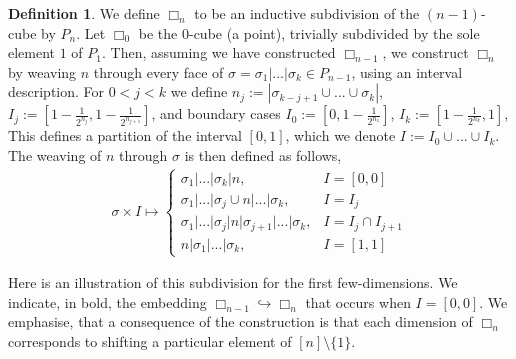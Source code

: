\documentclass{amsart}
\newcommand{\darkblue}{\color{darkblue}} %
\theoremstyle{definition}
\newtheorem{definition}[theorem]{Definition}
\newcommand{\defn}[1]{\textsl{\darkblue #1}} %
\newcommand{\divcube}[1]{\Box_{#1}}
\begin{document}
\begin{definition}
We define \defn{$\divcube{n}$} to be an inductive subdivision of the $(n-1)$-cube by $P_n$.
Let $\divcube{0}$ be the $0$-cube (a point), trivially subdivided by the sole element $1$ of $P_1$.
Then, assuming we have constructed $\divcube{n-1}$, we construct $\divcube{n}$ by weaving $n$ through every face of $\sigma = \sigma_1|...|\sigma_k \in P_{n-1}$, using an interval description.
For $0<j<k$ we define
$n_j := |\sigma_{k-j+1}\cup...\cup \sigma_k|$, $I_j := [1 - \frac{1}{2^{n_j}}, 1 - \frac{1}{2^{n_{j+1}}}]$, and boundary cases $I_0:= [0,1 - \frac{1}{2^{n_1}}]$, $I_k:= [1 - \frac{1}{2^{n_k}},1]$,
This defines a partition of the interval $[0,1]$, which we denote $I := I_0 \cup ... \cup I_k$.
The weaving of $n$ through $\sigma$ is then defined as follows,
\begin{align} \label{eq:SU cube inductive def}
    \sigma \times I \mapsto 
    \begin{cases}
        \sigma_1|...|\sigma_k| n, &I = [0, 0]\\
        \sigma_1|...|\sigma_j \cup n|...|\sigma_k, &I = I_j\\
        \sigma_1|...|\sigma_j|n|\sigma_{j+1}|...|\sigma_k, &I = I_j \cap I_{j+1}\\
        n|\sigma_1|...|\sigma_k, &I = [1, 1]
    \end{cases}
\end{align}
\end{definition}

Here is an illustration of this subdivision for the first few-dimensions.
We indicate, in bold, the embedding $\divcube{n-1}\hookrightarrow \divcube{n}$ that occurs when $I=[0, 0]$. 
We emphasise, that a consequence of the construction is that each dimension of $\divcube{n}$ corresponds to shifting a particular element of $[n]\setminus \{1\}$.
\end{document}

